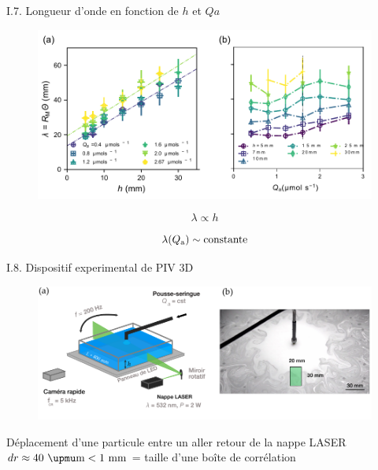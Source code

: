 \documentclass[aspectratio=169,10pt]{beamer}
\begin{document}
\begin{frame}{I.7. Longueur d'onde en fonction de $h$ et $Qa$}
    \begin{figure}[t]
        \centering
        \includegraphics[width=.85\textwidth]{./figures/Lambda_measurement_1.pdf}
    \end{figure}
    \vspace{-.8cm}
    
    \hspace{1cm}\begin{minipage}{6cm}
        \begin{ombretheo}
            \begin{theo}
                \[\lambda \propto h\]
            \end{theo}
        \end{ombretheo}
    \end{minipage}
    \hspace{.4cm}\begin{minipage}{6cm}
        \begin{ombretheo}
            \begin{theo}
                \[\lambda(Q_{\rm a}) \sim \rm constante\]
            \end{theo}
        \end{ombretheo}
    \end{minipage}
\end{frame}

\begin{frame}{I.8. Dispositif experimental de PIV 3D}
    \begin{figure}
        \centering
        \includegraphics[width=1\textwidth]{./figures/DispositifPIV_v2.pdf}
    \end{figure}
    
    Déplacement d'une particule entre un aller retour de la nappe LASER $dr\approx 40~\rm \upmu m < 1~\rm mm$ = taille d'une boîte de corrélation 
\end{frame}
\end{document}
